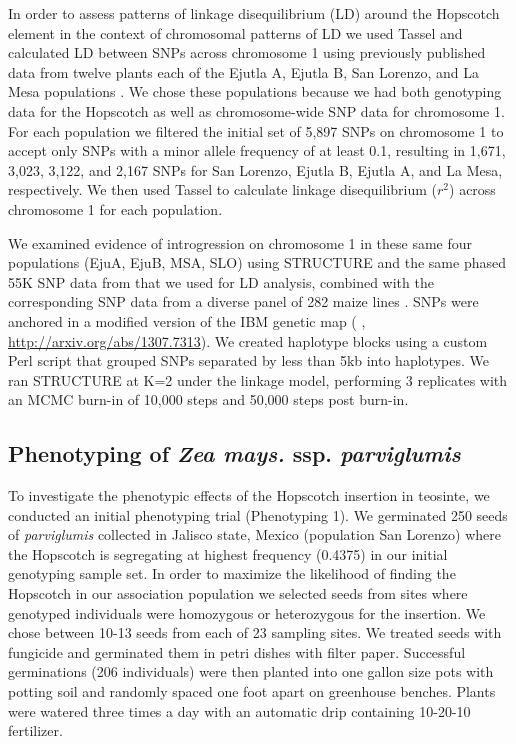 \documentclass[12pt]{article}
\begin{document}
In order to assess patterns of linkage disequilibrium (LD) around the Hopscotch element in the context of chromosomal patterns of LD we used Tassel \cite{Bradbury et al 2007} and calculated LD between SNPs across chromosome 1 using previously published data from twelve plants each of the Ejutla A, Ejutla B, San Lorenzo, and La Mesa populations \cite{Pyhajarvi et al 2013}. We chose these populations because we had both genotyping data for the Hopscotch as well as chromosome-wide SNP data for chromosome 1. For each population we filtered the initial set of 5,897 SNPs on chromosome 1 to accept only SNPs with a minor allele frequency of at least 0.1, resulting in 1,671, 3,023, 3,122, and 2,167 SNPs for San Lorenzo, Ejutla B, Ejutla A, and La Mesa, respectively. We then used Tassel \cite{Bradbury et al 2007} to calculate linkage disequilibrium ($r^{2}$) across chromosome 1 for each population. 

We examined evidence of introgression on chromosome 1 in these same four populations (EjuA, EjuB, MSA, SLO) using STRUCTURE \cite{Falush et al 2003} and the same phased 55K SNP data from \cite{Pyhajarvi et al 2013} that we used for LD analysis, combined with the corresponding SNP data from a diverse panel of 282 maize lines \cite{Cook et al 2012}. SNPs were anchored in a modified version of the IBM genetic map ( \cite{Gerke et al 2013}, \url{http://arxiv.org/abs/1307.7313}). We created haplotype blocks using a custom Perl script that grouped SNPs separated by less than 5kb into haplotypes. We ran STRUCTURE at K=2 under the linkage model, performing 3 replicates with an MCMC burn-in of 10,000 steps and 50,000 steps post burn-in. 

\subsection*{Phenotyping of \emph{Zea mays.} ssp. \emph{parviglumis}}

To investigate the phenotypic effects of the Hopscotch insertion in teosinte, we conducted an initial phenotyping trial (Phenotyping 1). We germinated 250 seeds of \emph{parviglumis} collected in Jalisco state, Mexico (population San Lorenzo) \cite{Hufford 2010} where the Hopscotch is segregating at highest frequency (0.4375) in our initial genotyping sample set. In order to maximize the likelihood of finding the Hopscotch in our association population we selected seeds from sites where genotyped individuals were homozygous or heterozygous for the insertion. We chose between 10-13 seeds from each of 23 sampling sites. We treated seeds with fungicide and germinated them in petri dishes with filter paper. Successful germinations (206 individuals) were then planted into one gallon size pots with potting soil and randomly spaced one foot apart on greenhouse benches. Plants were watered three times a day with an automatic drip containing 10-20-10 fertilizer. 
\end{document}
